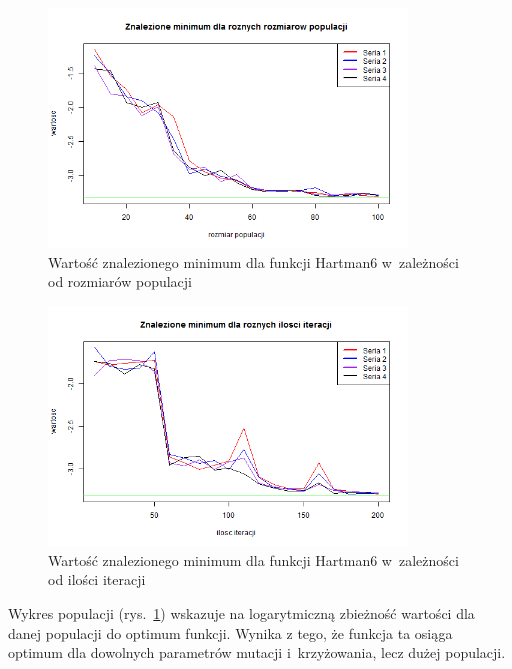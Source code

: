 \documentclass[11pt, a4paper]{article}
\newcommand{\fbi}{\leavevmode{\parindent=1em\indent}}
\begin{document}
\begin{figure}[H]
	\begin{center}
		\includegraphics[width=0.85\textwidth]{./assets/Hartman64.png}
		\caption{Wartość znalezionego minimum dla funkcji Hartman6 w~zależności od rozmiarów populacji}
		\label{fig:hartman64}
	\end{center}
\end{figure}


\begin{figure}[H]
	\begin{center}
		\includegraphics[width=0.85\textwidth]{./assets/Hartman65.png}
		\caption{Wartość znalezionego minimum dla funkcji Hartman6 w~zależności od ilości iteracji}
		\label{fig:hartman65}
	\end{center}
\end{figure}

\fbi
Wykres populacji (rys.~\ref{fig:hartman64}) wskazuje na logarytmiczną zbieżność wartości dla danej populacji do optimum funkcji. Wynika z tego, że funkcja ta osiąga optimum dla dowolnych parametrów mutacji i~krzyżowania, lecz dużej populacji.
\end{document}
